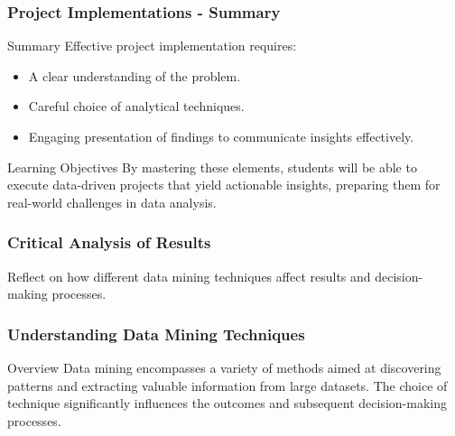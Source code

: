 \documentclass[aspectratio=169]{beamer}
\begin{document}
\begin{frame}
    \frametitle{Project Implementations - Summary}
    \begin{block}{Summary}
        Effective project implementation requires:
        \begin{itemize}
            \item A clear understanding of the problem.
            \item Careful choice of analytical techniques.
            \item Engaging presentation of findings to communicate insights effectively.
        \end{itemize}
    \end{block}
    \begin{block}{Learning Objectives}
        By mastering these elements, students will be able to execute data-driven projects that yield actionable insights, preparing them for real-world challenges in data analysis.
    \end{block}
\end{frame}

\begin{frame}[fragile]
    \frametitle{Critical Analysis of Results}
    Reflect on how different data mining techniques affect results and decision-making processes.
\end{frame}

\begin{frame}[fragile]
    \frametitle{Understanding Data Mining Techniques}
    \begin{block}{Overview}
        Data mining encompasses a variety of methods aimed at discovering patterns and extracting valuable information from large datasets. The choice of technique significantly influences the outcomes and subsequent decision-making processes.
    \end{block}
\end{frame}
\end{document}
